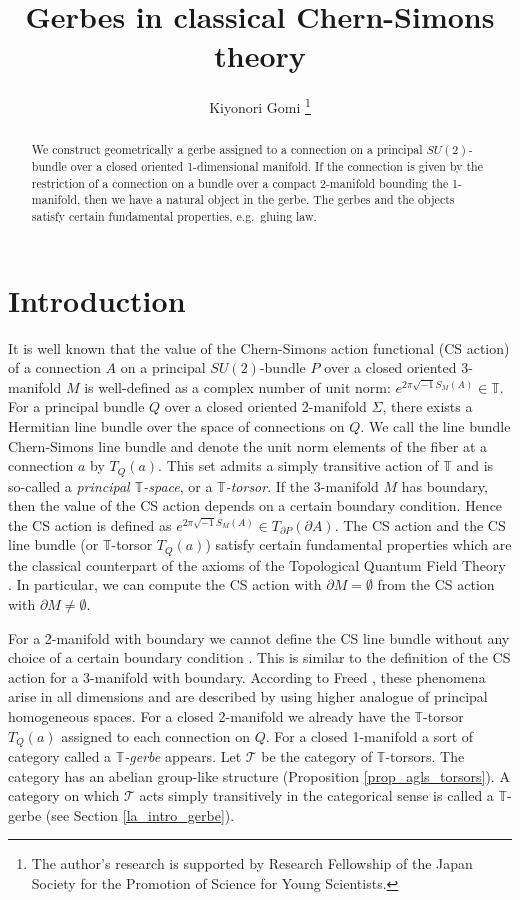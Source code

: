\documentclass[a4paper,a4paper]{article}
\title{Gerbes in classical Chern-Simons theory}
\author{Kiyonori Gomi
\thanks{The author's research is supported by Research Fellowship of the Japan Society for the Promotion of Science for Young Scientists.}}
\date{}
\theoremstyle{definition}
\theoremstyle{remark}
\newcommand{\T}{\mathbb{T}}
\newcommand{\sT}{\mathcal{T}}
\begin{document}
\maketitle

\begin{abstract}
We construct geometrically a gerbe assigned to a connection on a principal $SU(2)$-bundle over a closed oriented 1-dimensional manifold. If the connection is given by the restriction of a connection on a bundle over a compact 2-manifold bounding the 1-manifold, then we have a natural object in the gerbe. The gerbes and the objects satisfy certain fundamental properties, e.g.\ gluing law. 
\end{abstract}


\section{Introduction}
It is well known that the value of the Chern-Simons action functional (CS action) \cite{F1, R-S-W, W} of a connection $A$ on a principal $SU(2)$-bundle $P$ over a closed oriented 3-manifold $M$ is well-defined as a complex number of unit norm: $e^{2\pi\sqrt{-1} S_M(A)} \in \T$. For a principal bundle $Q$ over a closed oriented 2-manifold $\Sigma$, there exists a Hermitian line bundle over the space of connections on $Q$. We call the line bundle Chern-Simons line bundle and denote the unit norm elements of the fiber at a connection $a$ by $T_Q(a)$. This set admits a simply transitive action of $\T$ and is so-called a \textit{principal $\T$-space}, or a \textit{$\T$-torsor}. If the 3-manifold $M$ has boundary, then the value of the CS action depends on a certain boundary condition. Hence the CS action is defined as $e^{2\pi\sqrt{-1} S_M(A)} \in T_{\partial P}(\partial A)$. The CS action and the CS line bundle (or $\T$-torsor $T_Q(a)$) satisfy certain fundamental properties \cite{F1, F2} which are the classical counterpart of the axioms of the Topological Quantum Field Theory \cite{A}. In particular, we can compute the CS action with $\partial M = \emptyset$ from the CS action with $\partial M \neq \emptyset$.

For a 2-manifold with boundary we cannot define the CS line bundle without any choice of a certain boundary condition \cite{F1}. This is similar to the definition of the CS action for a 3-manifold with boundary. According to Freed \cite{F2}, these phenomena arise in all dimensions and are described by using higher analogue of principal homogeneous spaces. For a closed 2-manifold we already have the $\T$-torsor $T_Q(a)$ assigned to each connection on $Q$. For a closed 1-manifold a sort of category called a \textit{$\T$-gerbe} \cite{F2} appears. Let $\sT$ be the category of $\T$-torsors. The category has an abelian group-like structure (Proposition \ref{prop_agls_torsors}). A category on which $\sT$ acts simply transitively in the categorical sense is called a $\T$-gerbe (see Section \ref{la_intro_gerbe}). 
\end{document}

